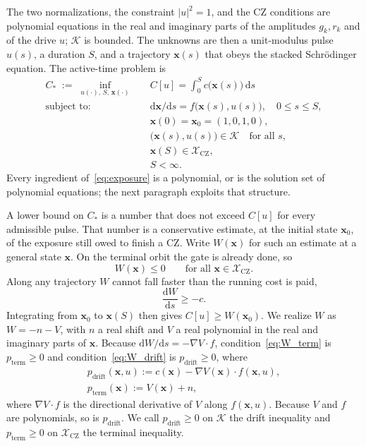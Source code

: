 \documentclass[aps,prx,reprint,nofootinbib,longbibliography,floatfix]{revtex4-2}
\theoremstyle{plain}
\theoremstyle{remark}
\newcommand{\dd}{\mathrm{d}}
\newcommand{\xv}{\boldsymbol{x}}
\begin{document}
The two normalizations, the constraint $|u|^2=1$, and the CZ conditions are
polynomial equations in the real and imaginary parts of the amplitudes
$g_k,r_k$ and of the drive $u$; $\mathcal K$ is bounded. The unknowns are then
a unit-modulus pulse $u(s)$, a duration $S$, and a trajectory $\xv(s)$ that
obeys the stacked Schrödinger equation. The active-time problem is
\begin{equation}
\begin{aligned}
C_* \;:=\; \inf_{u(\cdot),\,S,\,\xv(\cdot)}
& \quad C[u]=\int_0^S c\bigl(\xv(s)\bigr)\,\dd s \\
\text{subject to:}
& \quad \dd \xv/\dd s = f\bigl(\xv(s),u(s)\bigr), \quad 0\le s\le S, \\
& \quad \xv(0)=\xv_0=(1,0,1,0), \\
& \quad \bigl(\xv(s),u(s)\bigr)\in\mathcal K \quad \text{for all } s, \\
& \quad \xv(S)\in\mathcal{X}_{\mathrm{CZ}}, \\
& \quad S<\infty.
\end{aligned}
\label{eq:exposure}
\end{equation}
Every ingredient of~\eqref{eq:exposure} is a polynomial, or is the solution
set of polynomial equations; the next paragraph exploits that structure.

A lower bound on $C_*$ is a number that does not exceed $C[u]$ for every
admissible pulse. That number is a conservative estimate, at the initial state
$\xv_0$, of the exposure still owed to finish a CZ. Write $W(\xv)$ for such an
estimate at a general state $\xv$. On the terminal orbit the gate is already
done, so
\begin{equation}
W(\xv)\le 0 \qquad\text{for all }\xv\in\mathcal{X}_{\mathrm{CZ}}.
\label{eq:W_term}
\end{equation}
Along any trajectory $W$ cannot fall faster than the running cost is paid,
\begin{equation}
\frac{\dd W}{\dd s}\ge -c.
\label{eq:W_drift}
\end{equation}
Integrating from $\xv_0$ to $\xv(S)$ then gives $C[u]\ge W(\xv_0)$. We realize $W$ as
$W=-n-V$, with $n$ a real shift and $V$ a real polynomial in the real and
imaginary parts of $\xv$. Because $\dd W/\dd s=-\nabla V\cdot f$,
condition~\eqref{eq:W_term} is $p_{\mathrm{term}}\ge0$ and
condition~\eqref{eq:W_drift} is $p_{\mathrm{drift}}\ge0$, where
\begin{equation}
\begin{gathered}
p_{\mathrm{drift}}(\xv,u):=c(\xv)-\nabla V(\xv)\cdot f(\xv,u),\\
p_{\mathrm{term}}(\xv):=V(\xv)+n,
\end{gathered}
\label{eq:barrier_polys}
\end{equation}
where $\nabla V\cdot f$ is the directional derivative of $V$ along $f(\xv,u)$.
Because $V$ and $f$ are polynomials, so is $p_{\mathrm{drift}}$. We call
$p_{\mathrm{drift}}\ge0$ on $\mathcal K$ the drift inequality and
$p_{\mathrm{term}}\ge0$ on $\mathcal{X}_{\mathrm{CZ}}$ the terminal inequality.
\end{document}
